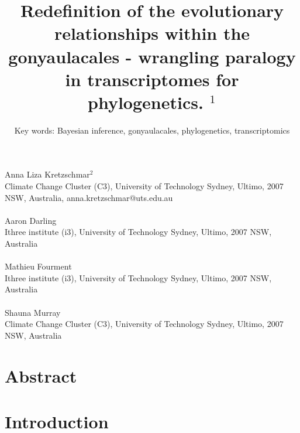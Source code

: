 \documentclass[12pt]{article}
\title{Redefinition of the evolutionary relationships within the gonyaulacales - wrangling paralogy in transcriptomes for phylogenetics. $^{1}$}
\author{Key words: Bayesian inference, gonyaulacales, phylogenetics, transcriptomics}
\date{}
\begin{document}
\maketitle
\paragraph{}Anna Liza Kretzschmar$^{2}$\\
Climate Change Cluster (C3), University of Technology Sydney, Ultimo, 2007 NSW, Australia, anna.kretzschmar@uts.edu.au
\paragraph{}Aaron Darling \\
Ithree institute (i3), University of Technology Sydney, Ultimo, 2007 NSW, Australia
\paragraph{}Mathieu Fourment \\
Ithree institute (i3), University of Technology Sydney, Ultimo, 2007 NSW, Australia
\paragraph{}Shauna Murray\\ 
Climate Change Cluster (C3), University of Technology Sydney, Ultimo, 2007 NSW, Australia
\newpage
\section{Abstract}
\newpage

\section{Introduction}
\end{document}
